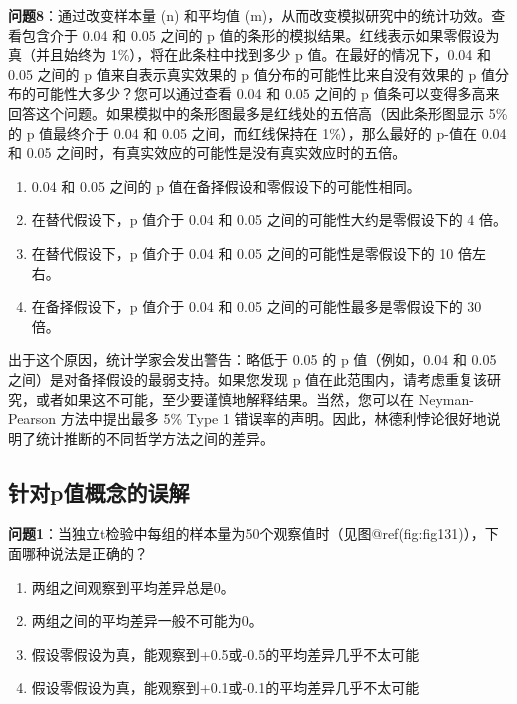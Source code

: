 \documentclass[
  letterpaper,
  DIV=11,
  numbers=noendperiod]{scrreprt}
\providecommand{\tightlist}{%
  \setlength{\itemsep}{0pt}\setlength{\parskip}{0pt}}\usepackage{longtable,booktabs,array}
\begin{document}
\textbf{问题8}：通过改变样本量 (n) 和平均值
(m)，从而改变模拟研究中的统计功效。查看包含介于 0.04 和 0.05 之间的 p
值的条形的模拟结果。红线表示如果零假设为真（并且始终为
1\%），将在此条柱中找到多少 p 值。在最好的情况下，0.04 和 0.05 之间的 p
值来自表示真实效果的 p 值分布的可能性比来自没有效果的 p
值分布的可能性大多少？您可以通过查看 0.04 和 0.05 之间的 p
值条可以变得多高来回答这个问题。如果模拟中的条形图最多是红线处的五倍高（因此条形图显示
5\% 的 p 值最终介于 0.04 和 0.05 之间，而红线保持在 1\%），那么最好的
p-值在 0.04 和 0.05 之间时，有真实效应的可能性是没有真实效应时的五倍。

\begin{enumerate}
\def\labelenumi{\Alph{enumi})}
\tightlist
\item
  0.04 和 0.05 之间的 p 值在备择假设和零假设下的可能性相同。
\item
  在替代假设下，p 值介于 0.04 和 0.05 之间的可能性大约是零假设下的 4
  倍。
\item
  在替代假设下，p 值介于 0.04 和 0.05 之间的可能性是零假设下的 10
  倍左右。
\item
  在备择假设下，p 值介于 0.04 和 0.05 之间的可能性最多是零假设下的 30
  倍。
\end{enumerate}

出于这个原因，统计学家会发出警告：略低于 0.05 的 p 值（例如，0.04 和
0.05 之间）是对备择假设的最弱支持。如果您发现 p
值在此范围内，请考虑重复该研究，或者如果这不可能，至少要谨慎地解释结果。当然，您可以在
Neyman-Pearson 方法中提出最多 5\% Type 1
错误率的声明。因此，林德利悖论很好地说明了统计推断的不同哲学方法之间的差异。

\hypertarget{ux9488ux5bf9pux503cux6982ux5ff5ux7684ux8befux89e3}{%
\subsection{针对p值概念的误解}\label{ux9488ux5bf9pux503cux6982ux5ff5ux7684ux8befux89e3}}

\textbf{问题1}：当独立t检验中每组的样本量为50个观察值时（见图@ref(fig:fig131)），下面哪种说法是正确的？

\begin{enumerate}
\def\labelenumi{\Alph{enumi})}
\tightlist
\item
  两组之间观察到平均差异总是0。
\item
  两组之间的平均差异一般不可能为0。
\item
  假设零假设为真，能观察到+0.5或-0.5的平均差异几乎不太可能
\item
  假设零假设为真，能观察到+0.1或-0.1的平均差异几乎不太可能
\end{enumerate}
\end{document}
